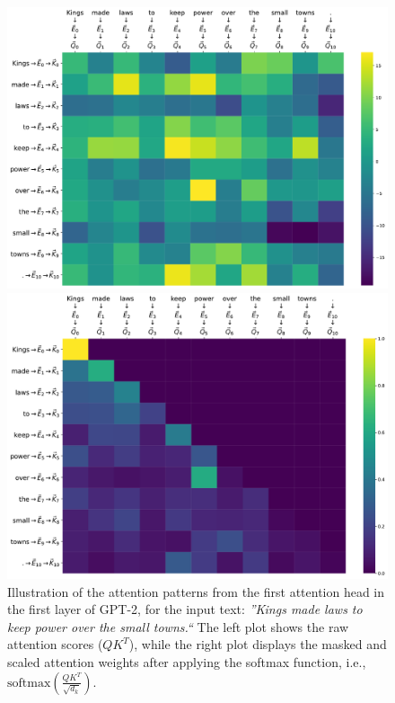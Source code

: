 \begin{figure}[H]
  \centering
  \begin{minipage}[b]{0.45\linewidth}
    \includegraphics[width=\linewidth]{images/normal_attn.pdf}
  \end{minipage}
  \hfill
  \begin{minipage}[b]{0.45\linewidth}
    \includegraphics[width=\linewidth]{images/mod_attn.pdf}
  \end{minipage}
\caption{Illustration of the attention patterns from the first attention head in the first layer of GPT-2, for the input text: 
\textit{''Kings made laws to keep power over the small towns.``} The left plot shows the raw attention scores ($QK^T$), while 
the right plot displays the masked and scaled attention weights after applying the softmax function, i.e., 
$\text{softmax}\left(\frac{QK^T}{\sqrt{d_k}}\right)$.}
\end{figure}

